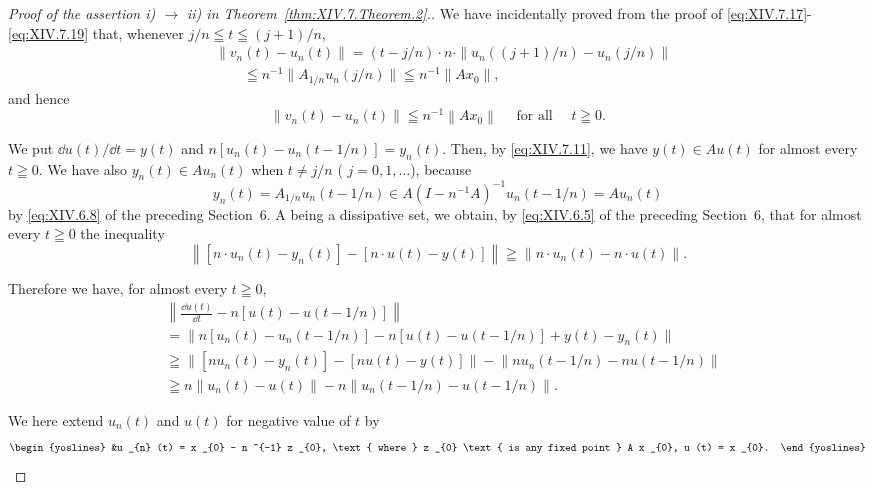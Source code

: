 \begin{proof}[Proof of the assertion i) $\to$ ii) in Theorem~\ref{thm:XIV.7.Theorem.2}.]
We have incidentally proved from the proof of \eqref{eq:XIV.7.17}-\eqref{eq:XIV.7.19} that, whenever $j / n \leqq t \leqq (j + 1) / n$, 
\[
\begin{aligned} & {\| v _{n} (t) - u _{n} (t) \| = (t - j / n) \cdot n \cdot \| u _{n} ((j + 1) / n) - u _{n} (j / n) \|} \\ & {\qquad \leqq n ^{-1} \| A _{1/n} u _{n} (j / n) \| \leqq n ^{-1} \| A x _{0} \|,} \end{aligned}
\]
and hence 
\begin{equation}\label{eq:XIV.7.20}
\left\| v _{n} (t) - u _{n} (t) \right\| \leqq n ^{-1} \left\| A x _{0} \right\| \quad \text{ for all } \quad t \geqq 0.
\end{equation}

We put $\dd u(t) / \dd t = y(t)$ and $n[u_n(t) - u_n(t - 1/n)] = y_n(t)$. Then, by \eqref{eq:XIV.7.11}, we have $y(t) \in Au(t)$ for almost every $t \geqq 0$. We have also $y_n(t) \in Au_n(t)$ when $t \neq j/n$ ( $j = 0, 1, \ldots$), because 
\[
y _{n} (t) = A _{1/n} u _{n} (t - 1 / n) \in A (I - n ^{-1} A) ^{-1} u _{n} (t - 1 / n) = A u _{n} (t)
\]
by \eqref{eq:XIV.6.8} of the preceding Section~\hyperref[sec:XIV.6]{$6$}. A being a dissipative set, we obtain, by \eqref{eq:XIV.6.5} of the preceding Section~\hyperref[sec:XIV.6]{$6$}, that for almost every $t \geqq 0$ the inequality 
\[
\left\| [ n \cdot u _{n} (t) - y _{n} (t) ] - [ n \cdot u (t) - y (t) ] \right\| \geqq \left\| n \cdot u _{n} (t) - n \cdot u (t) \right\|.
\]

Therefore we have, for almost every $t \geqq 0$, 
\begin{equation}\label{eq:XIV.7.21}
\begin{aligned}
&\left\|\frac{\dd u(t)}{\dd t}-n[u(t)-u(t-1/n)]\right\|\\
&=\bigl\|n[u_n(t)-u_n(t-1/n)]-n[u(t)-u(t-1/n)]+y(t)-y_n(t)\bigr\|\\
&\geqq\bigl\|[n u_n(t)-y_n(t)]-[n u(t)-y(t)]\bigr\|
  -\bigl\|n u_n(t-1/n)-n u(t-1/n)\bigr\|\\
&\geqq n\|u_n(t)-u(t)\|-n\|u_n(t-1/n)-u(t-1/n)\|.
\end{aligned}
\end{equation}

We here extend $u_{n}(t)$ and $u(t)$ for negative value of $t$ by 
\begin{equation}\label{eq:XIV.7.22}
\begin{yoslines}
&u _{n} (t) = x _{0} - n ^{-1} z _{0}, \text{ where } z _{0} \text{ is any fixed point } A x _{0}, u (t) = x _{0}.
\end{yoslines}
\end{equation}


\end{proof}
